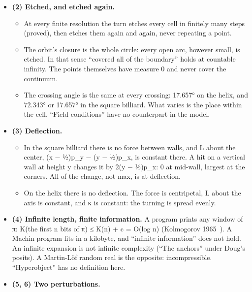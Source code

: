 \begin{itemize}
\item \textbf{(2) Etched, and etched again.}

\begin{itemize}
\item At every finite resolution the turn etches every cell in finitely many steps (proved), then etches them again and again, never repeating a point.
\item The orbit's closure is the whole circle: every open arc, however small, is etched. In that sense “covered all of the boundary” holds at countable infinity. The points themselves have measure 0 and never cover the continuum.
\item The crossing angle is the same at every crossing: 17.657° on the helix, and 72.343° or 17.657° in the square billiard. What varies is the place within the cell. “Field conditions” have no counterpart in the model.
\end{itemize}
\item \textbf{(3) Deflection.}

\begin{itemize}
\item In the square billiard there is no force between walls, and L about the center, (x − ½)p\_\allowbreak{}y − (y − ½)p\_\allowbreak{}x, is constant there. A hit on a vertical wall at height y changes it by 2(y − ½)p\_\allowbreak{}x: 0 at mid-wall, largest at the corners. All of the change, not max, is at deflection.
\item On the helix there is no deflection. The force is centripetal, L about the axis is constant, and κ is constant: the turning is spread evenly.
\end{itemize}
\item \textbf{(4) Infinite length, finite information.} A program prints any window of π: K(the first n bits of π) ≤ K(n) + c = O(log n) (Kolmogorov 1965~\cite{src:Kolmogorov-1965}). A Machin program fits in a kilobyte, and “infinite information” does not hold. An infinite expansion is not infinite complexity (“The anchors” under Doug's posits). A Martin-Löf random real is the opposite: incompressible. “Hyperobject” has no definition here.
\item \textbf{(5, 6) Two perturbations.}


\end{itemize}

